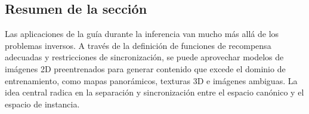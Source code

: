 \subsection{Resumen de la sección}

Las aplicaciones de la guía durante la inferencia van mucho más allá de los problemas inversos. A través de la definición de funciones de recompensa adecuadas y restricciones de sincronización, se puede aprovechar modelos de imágenes 2D preentrenados para generar contenido que excede el dominio de entrenamiento, como mapas panorámicos, texturas 3D e imágenes ambiguas. La idea central radica en la separación y sincronización entre el espacio canónico y el espacio de instancia.
